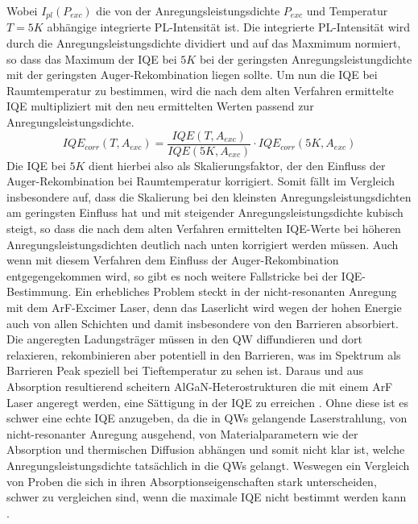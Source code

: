 \vspace{0.1cm}
\noindent
%
Wobei $I_{pl}(P_{exc})$ die von der Anregungsleistungsdichte $P_{exc}$ und Temperatur $T = 5K$ abhängige integrierte PL-Intensität ist. Die integrierte PL-Intensität wird durch die Anregungsleistungsdichte dividiert und auf das Maxmimum normiert, so dass das Maximum der IQE bei $5K$ bei der geringsten Anregungsleistungdichte mit der geringsten Auger-Rekombination liegen sollte. Um nun die IQE bei Raumtemperatur zu bestimmen, wird die nach dem alten Verfahren ermittelte IQE multipliziert mit den neu ermittelten Werten passend zur Anregungsleistungsdichte. 
%
\begin{equation}
    IQE_{corr}(T, A_{exc}) = \frac{IQE(T,A_{exc})}{IQE(5K,A_{exc})} \cdot IQE_{corr}(5K,A_{exc})
    \label{eq:iqetrue300k}
\end{equation}
%
Die IQE bei $5K$ dient hierbei also als Skalierungsfaktor, der den Einfluss der Auger-Rekombination bei Raumtemperatur korrigiert. Somit fällt im Vergleich insbesondere auf, dass die Skalierung bei den kleinsten Anregungsleistungsdichten am geringsten Einfluss hat und mit steigender Anregungsleistungsdichte kubisch steigt, so dass die nach dem alten Verfahren ermittelten IQE-Werte bei höheren Anregungsleistungsdichten deutlich nach unten korrigiert werden müssen. 
Auch wenn mit diesem Verfahren dem Einfluss der Auger-Rekombination entgegengekommen wird, so gibt es noch weitere Fallstricke bei der IQE-Bestimmung. Ein erhebliches Problem steckt in der nicht-resonanten Anregung mit dem ArF-Excimer Laser, denn das Laserlicht wird wegen der hohen Energie auch von allen Schichten und damit insbesondere von den Barrieren absorbiert. Die angeregten Ladungsträger müssen in den QW diffundieren und dort relaxieren, rekombinieren aber potentiell in den Barrieren, was im Spektrum als Barrieren Peak speziell bei Tieftemperatur zu sehen ist.
Daraus und aus Absorption resultierend scheitern AlGaN-Heterostrukturen die mit einem ArF Laser angeregt werden, eine Sättigung in der IQE zu erreichen \cite{doi:10.1063/1.4965298}. Ohne diese ist es schwer eine echte IQE anzugeben, da die in QWs gelangende Laserstrahlung, von nicht-resonanter Anregung ausgehend, von Materialparametern wie der Absorption und thermischen Diffusion abhängen und somit nicht klar ist, welche Anregungsleistungsdichte tatsächlich in die QWs gelangt. Weswegen ein Vergleich von Proben die sich in ihren Absorptionseigenschaften stark unterscheiden, schwer zu vergleichen sind, wenn die maximale IQE nicht bestimmt werden kann \cite{doi:10.1063/1.5044383}. 

